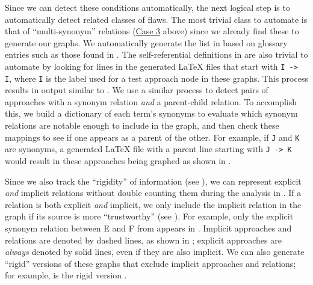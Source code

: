     Since we can detect these conditions automatically, the next logical step
    is to automatically detect related classes of flaws. The most trivial class
    to automate is that of ``multi-synonym'' relations
    (\hyperref[case-three]{Case 3} above) since we already find these to
    generate our graphs. We automatically generate the list in 
    based on glossary entries such as those found in
    . The self-referential definitions in
     are also trivial to automate by looking for lines in the
    generated \LaTeX{} files that start with \texttt{I -> I}, where \texttt{I}
    is the label used for a test approach node in these graphs. This process
    results in output similar to . We use a similar
    process to detect pairs of approaches with a synonym relation \emph{and} a
    parent-child relation. To accomplish this, we build a dictionary of each
    term's synonyms to evaluate which synonym relations are notable enough to
    include in the graph, and then check these mappings to see if one appears
    as a parent of the other. For example, if \texttt{J} and \texttt{K} are
    synonyms, a generated \LaTeX{} file with a parent line starting with
    \texttt{J -> K} would result in these approaches being graphed as shown in
    .

    \label{graphRigid}
    Since we also track the ``rigidity'' of information (see ),
    we can represent explicit
    \emph{and} implicit relations without double counting them during the
    analysis in . If a relation is both explicit
    \emph{and} implicit, we only include the implicit relation in the graph
    if its source is more ``trustworthy'' (see ).
    For example, only the explicit synonym relation between E and F
    from  appears in .
    Implicit approaches and relations are denoted by dashed lines, as shown
    in ; explicit approaches are
    \emph{always} denoted by solid lines, even if they are also implicit.
    We can also generate ``rigid'' versions of these graphs that exclude
    implicit approaches and relations; for example,
     is the rigid version .

